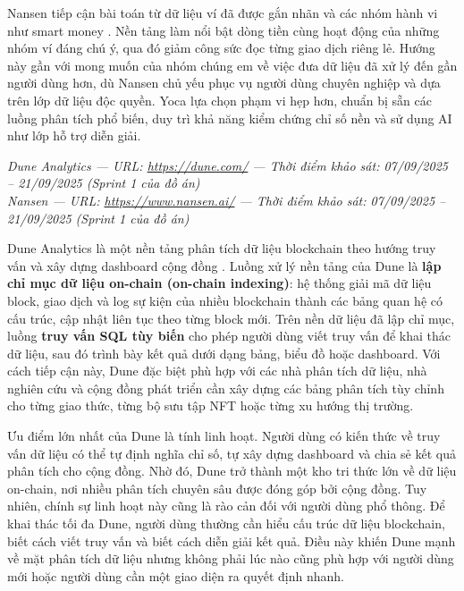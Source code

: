 Nansen tiếp cận bài toán từ dữ liệu ví đã được gắn nhãn và các nhóm hành vi như smart money \cite{nansenai}. Nền tảng làm nổi bật dòng tiền cùng hoạt động của những nhóm ví đáng chú ý, qua đó giảm công sức đọc từng giao dịch riêng lẻ. Hướng này gần với mong muốn của nhóm chúng em về việc đưa dữ liệu đã xử lý đến gần người dùng hơn, dù Nansen chủ yếu phục vụ người dùng chuyên nghiệp và dựa trên lớp dữ liệu độc quyền. Yoca lựa chọn phạm vi hẹp hơn, chuẩn bị sẵn các luồng phân tích phổ biến, duy trì khả năng kiểm chứng chỉ số nền và sử dụng AI như lớp hỗ trợ diễn giải.

\noindent\textit{\small Dune Analytics --- URL: \url{https://dune.com/} \quad--- \quad Thời điểm khảo sát: 07/09/2025 -- 21/09/2025 (Sprint 1 của đồ án)}\\
\noindent\textit{\small Nansen --- URL: \url{https://www.nansen.ai/} \quad--- \quad Thời điểm khảo sát: 07/09/2025 -- 21/09/2025 (Sprint 1 của đồ án)}
\vspace{1mm}

Dune Analytics là một nền tảng phân tích dữ liệu blockchain theo hướng truy vấn và xây dựng dashboard cộng đồng \cite{dune}. Luồng xử lý nền tảng của Dune là \textbf{lập chỉ mục dữ liệu on-chain (on-chain indexing)}: hệ thống giải mã dữ liệu block, giao dịch và log sự kiện của nhiều blockchain thành các bảng quan hệ có cấu trúc, cập nhật liên tục theo từng block mới. Trên nền dữ liệu đã lập chỉ mục, luồng \textbf{truy vấn SQL tùy biến} cho phép người dùng viết truy vấn để khai thác dữ liệu, sau đó trình bày kết quả dưới dạng bảng, biểu đồ hoặc dashboard. Với cách tiếp cận này, Dune đặc biệt phù hợp với các nhà phân tích dữ liệu, nhà nghiên cứu và cộng đồng phát triển cần xây dựng các bảng phân tích tùy chỉnh cho từng giao thức, từng bộ sưu tập NFT hoặc từng xu hướng thị trường.

Ưu điểm lớn nhất của Dune là tính linh hoạt. Người dùng có kiến thức về truy vấn dữ liệu có thể tự định nghĩa chỉ số, tự xây dựng dashboard và chia sẻ kết quả phân tích cho cộng đồng. Nhờ đó, Dune trở thành một kho tri thức lớn về dữ liệu on-chain, nơi nhiều phân tích chuyên sâu được đóng góp bởi cộng đồng. Tuy nhiên, chính sự linh hoạt này cũng là rào cản đối với người dùng phổ thông. Để khai thác tối đa Dune, người dùng thường cần hiểu cấu trúc dữ liệu blockchain, biết cách viết truy vấn và biết cách diễn giải kết quả. Điều này khiến Dune mạnh về mặt phân tích dữ liệu nhưng không phải lúc nào cũng phù hợp với người dùng mới hoặc người dùng cần một giao diện ra quyết định nhanh.

